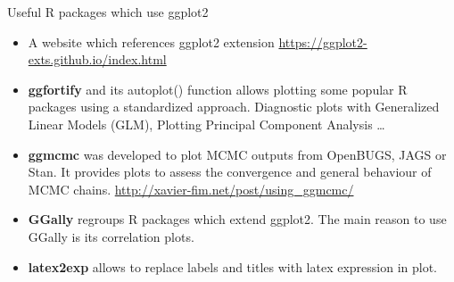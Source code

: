 \documentclass[
  ignorenonframetext,
]{beamer}
\begin{document}
\begin{frame}{Useful R packages which use ggplot2}
\protect\hypertarget{useful-r-packages-which-use-ggplot2}{}

\begin{itemize}
\item
  A website which references ggplot2 extension
  \url{https://ggplot2-exts.github.io/index.html}
\item
  \textbf{ggfortify} and its autoplot() function allows plotting some
  popular R packages using a standardized approach. Diagnostic plots
  with Generalized Linear Models (GLM), Plotting Principal Component
  Analysis \ldots{}
\item
  \textbf{ggmcmc} was developed to plot MCMC outputs from OpenBUGS, JAGS
  or Stan. It provides plots to assess the convergence and general
  behaviour of MCMC chains.
  \url{http://xavier-fim.net/post/using_ggmcmc/}
\item
  \textbf{GGally} regroups R packages which extend ggplot2. The main
  reason to use GGally is its correlation plots.
\item
  \textbf{latex2exp} allows to replace labels and titles with latex
  expression in plot.
\end{itemize}

\end{frame}
\end{document}
